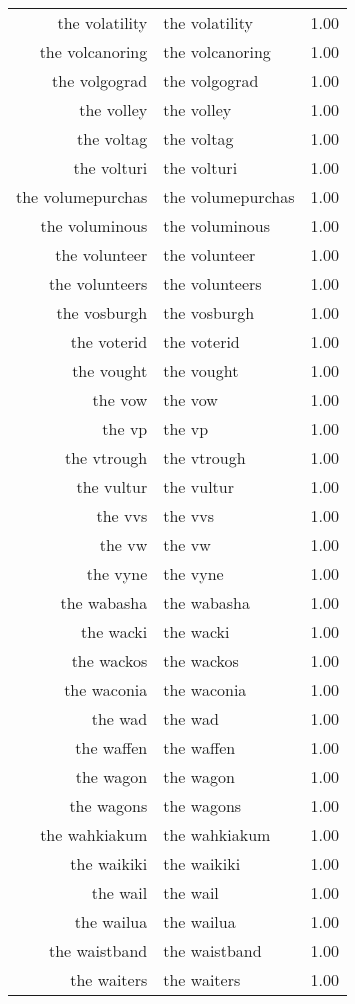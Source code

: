 \begin{table}[ht]
\begin{tabular}{rlr}
  the volatility & the volatility & 1.00 \\ 
  the volcanoring & the volcanoring & 1.00 \\ 
  the volgograd & the volgograd & 1.00 \\ 
  the volley & the volley & 1.00 \\ 
  the voltag & the voltag & 1.00 \\ 
  the volturi & the volturi & 1.00 \\ 
  the volumepurchas & the volumepurchas & 1.00 \\ 
  the voluminous & the voluminous & 1.00 \\ 
  the volunteer & the volunteer & 1.00 \\ 
  the volunteers & the volunteers & 1.00 \\ 
  the vosburgh & the vosburgh & 1.00 \\ 
  the voterid & the voterid & 1.00 \\ 
  the vought & the vought & 1.00 \\ 
  the vow & the vow & 1.00 \\ 
  the vp & the vp & 1.00 \\ 
  the vtrough & the vtrough & 1.00 \\ 
  the vultur & the vultur & 1.00 \\ 
  the vvs & the vvs & 1.00 \\ 
  the vw & the vw & 1.00 \\ 
  the vyne & the vyne & 1.00 \\ 
  the wabasha & the wabasha & 1.00 \\ 
  the wacki & the wacki & 1.00 \\ 
  the wackos & the wackos & 1.00 \\ 
  the waconia & the waconia & 1.00 \\ 
  the wad & the wad & 1.00 \\ 
  the waffen & the waffen & 1.00 \\ 
  the wagon & the wagon & 1.00 \\ 
  the wagons & the wagons & 1.00 \\ 
  the wahkiakum & the wahkiakum & 1.00 \\ 
  the waikiki & the waikiki & 1.00 \\ 
  the wail & the wail & 1.00 \\ 
  the wailua & the wailua & 1.00 \\ 
  the waistband & the waistband & 1.00 \\ 
  the waiters & the waiters & 1.00 \\ 

\end{tabular}
\end{table}
